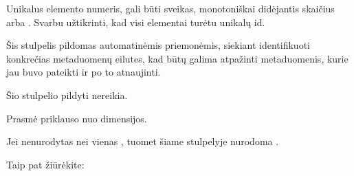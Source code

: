 \documentclass[letterpaper,10pt,lithuanian]{sphinxmanual}
\begin{document}
\begin{fulllineitems}
\label{\detokenize{formatas:id}}
\pysigstartsignatures
\pysigline
{}
\pysigstopsignatures
\sphinxAtStartPar
{}

\sphinxAtStartPar
Unikalus elemento numeris, gali būti sveikas, monotoniškai didėjantis
skaičius arba . Svarbu užtikrinti, kad visi elementai
turėtu unikalų id.

\sphinxAtStartPar
Šis stulpelis pildomas automatinėmis priemonėmis, siekiant identifikuoti
konkrečias metaduomenų eilutes, kad būtų galima atpažinti metaduomenis,
kurie jau buvo pateikti ir po to atnaujinti.

\sphinxAtStartPar
Šio stulpelio pildyti nereikia.

\end{fulllineitems}


\begin{fulllineitems}
\label{\detokenize{formatas:type}}
\pysigstartsignatures
\pysigline
{}
\pysigstopsignatures
\sphinxAtStartPar
{}

\sphinxAtStartPar
Prasmė priklauso nuo dimensijos.

\sphinxAtStartPar
Jei nenurodytas nei vienas {\hyperref[\detokenize{formatas:dimensijos-stulpeliai}]{}}, tuomet šiame stulpelyje nurodoma {\hyperref[\detokenize{dimensijos:papildomos-dimensijos}]{}}.


\begin{sphinxseealso}{Taip pat žiūrėkite:}

\sphinxAtStartPar
{\hyperref[\detokenize{tipai:duomenu-tipai}]{}}


\end{sphinxseealso}


\end{fulllineitems}

\end{document}
